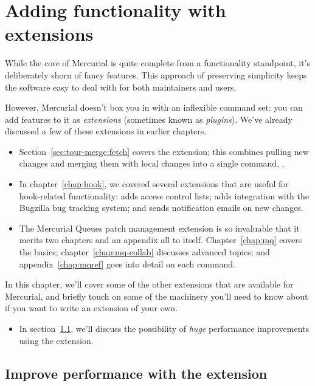 \chapter{Adding functionality with extensions}
\label{chap:hgext}

While the core of Mercurial is quite complete from a functionality
standpoint, it's deliberately shorn of fancy features.  This approach
of preserving simplicity keeps the software easy to deal with for both
maintainers and users.

However, Mercurial doesn't box you in with an inflexible command set:
you can add features to it as \emph{extensions} (sometimes known as
\emph{plugins}).  We've already discussed a few of these extensions in
earlier chapters.
\begin{itemize}
\item Section~\ref{sec:tour-merge:fetch} covers the 
  extension; this combines pulling new changes and merging them with
  local changes into a single command, .
\item In chapter~\ref{chap:hook}, we covered several extensions that
  are useful for hook-related functionality:  adds access
  control lists;  adds integration with the Bugzilla
  bug tracking system; and  sends notification emails on
  new changes.
\item The Mercurial Queues patch management extension is so invaluable
  that it merits two chapters and an appendix all to itself.
  Chapter~\ref{chap:mq} covers the basics;
  chapter~\ref{chap:mq-collab} discusses advanced topics; and
  appendix~\ref{chap:mqref} goes into detail on each command.
\end{itemize}

In this chapter, we'll cover some of the other extensions that are
available for Mercurial, and briefly touch on some of the machinery
you'll need to know about if you want to write an extension of your
own.
\begin{itemize}
\item In section~\ref{sec:hgext:inotify}, we'll discuss the
  possibility of \emph{huge} performance improvements using the
   extension.
\end{itemize}

\section{Improve performance with the  extension}
\label{sec:hgext:inotify}

